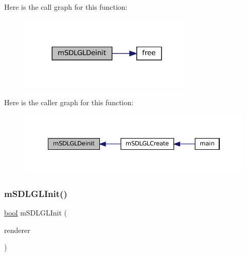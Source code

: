 Here is the call graph for this function\+:
\nopagebreak
\begin{figure}[H]
\begin{center}
\leavevmode
\includegraphics[width=239pt]{gl-sdl_8c_a0752bf9d71fd545b20003352ac4d36c9_cgraph}
\end{center}
\end{figure}
Here is the caller graph for this function\+:
\nopagebreak
\begin{figure}[H]
\begin{center}
\leavevmode
\includegraphics[width=350pt]{gl-sdl_8c_a0752bf9d71fd545b20003352ac4d36c9_icgraph}
\end{center}
\end{figure}
\mbox{\label{gl-sdl_8c_a59b282969b17f19eff20d0fa9946867a}} 
\subsubsection{\texorpdfstring{m\+S\+D\+L\+G\+L\+Init()}{mSDLGLInit()}}
{\footnotesize\ttfamily \mbox{\hyperlink{libretro_8h_a4a26dcae73fb7e1528214a068aca317e}{bool}} m\+S\+D\+L\+G\+L\+Init (\begin{DoxyParamCaption}\item[{struct \mbox{\hyperlink{structm_s_d_l_renderer}{m\+S\+D\+L\+Renderer}} $\ast$}]{renderer }\end{DoxyParamCaption})\hspace{0.3cm}{\ttfamily [static]}}

